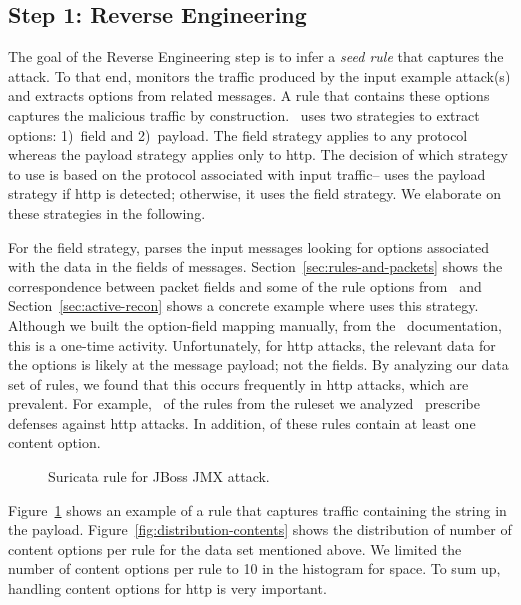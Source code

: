 \documentclass[conference]{IEEEtran}
\begin{document}
\subsection{Step 1: Reverse Engineering}
\label{sec:reverse-engineering}

The goal of the Reverse Engineering step is to infer a \emph{seed
  rule} that captures the attack. To that end, \tname{} monitors the
traffic produced by the input example attack(s) and extracts options
from related messages. A rule that contains these options captures the
malicious traffic by construction. \tname\ uses two strategies to
extract options: 1)~field and 2)~payload. The field strategy applies
to any protocol whereas the payload strategy applies only to http.
The decision of which strategy to use is based on the protocol
associated with input traffic--\tname{} uses the payload strategy if
http is detected; otherwise, it uses the field strategy. We elaborate
on these strategies in the following.

For the field strategy, \tname{} parses the input messages looking for
options associated with the data in the fields of
messages. Section~\ref{sec:rules-and-packets} shows the correspondence
between packet fields and some of the rule options from \suri\ and
Section~\ref{sec:active-recon} shows a concrete example where \tname{}
uses this strategy. Although we built the option-field mapping
manually, from the \suri\ documentation, this is a one-time activity.
Unfortunately, for http attacks, the relevant data for the options is
likely at the message payload; not the fields. By analyzing our data
set of rules, we found that this occurs frequently in http attacks,
which are prevalent. For example, \percHttp\ of the \numrulessuri{}
rules from the ruleset we analyzed~\cite{emerging-threats-open}
prescribe defenses against http attacks. In addition,
\percRulesWithContent{} of these rules contain at least one content
option.

\begin{figure}[h!]
  
  \vspace{-1ex}  
  \caption{Suricata rule for JBoss JMX attack.}
  \vspace{-2ex}  
  \label{fig:adaptor-golden-rule.suricata}
\end{figure}

Figure~\ref{fig:adaptor-golden-rule.suricata} shows an example of a rule that
captures traffic containing the string  in the
payload.  Figure~\ref{fig:distribution-contents} shows the
distribution of number of content options per rule for the data set
mentioned above. We limited the number of content options per rule to
10 in the histogram for space.   To sum up, handling
content options for http is very important.
\end{document}
